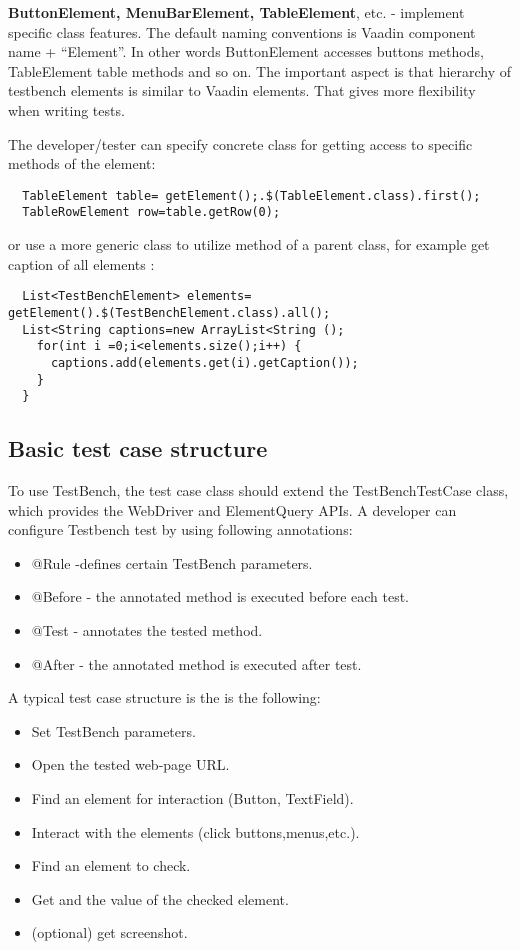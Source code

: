 \textbf{ButtonElement, MenuBarElement, TableElement}, etc. - implement specific
class features. The default naming conventions is Vaadin component name + ``Element''.
In other words ButtonElement accesses buttons methods, TableElement table methods and so on.
The important aspect is that hierarchy of testbench elements is similar to Vaadin elements.
That gives more flexibility when writing tests.

The  developer/tester can specify concrete class for getting access to specific methods of the element:
 
 \lstset{language=Java}
  \begin{lstlisting}
  TableElement table= getElement();.$(TableElement.class).first();
  TableRowElement row=table.getRow(0);
 \end{lstlisting}
 
or use a more generic class to utilize method of a parent class, for example get caption of all elements :

  \lstset{language=Java}
  \begin{lstlisting}
  List<TestBenchElement> elements= getElement().$(TestBenchElement.class).all();
  List<String captions=new ArrayList<String ();
    for(int i =0;i<elements.size();i++) {
      captions.add(elements.get(i).getCaption());
    }
  }
  \end{lstlisting}

\subsection {Basic test case structure}
To use TestBench, the test case class should extend the TestBenchTestCase class,
which provides the WebDriver and ElementQuery APIs. A developer
can configure Testbench test by using following annotations:
\begin{itemize}
  \item @Rule -defines certain TestBench parameters.
  \item @Before - the annotated method is executed before each test.
  \item @Test - annotates the tested method.
  \item @After - the annotated method is executed after test.
\end{itemize}

A typical test case structure is the is the following:
\begin{itemize}
  \item Set TestBench parameters.
  \item Open the tested web-page URL.
  \item Find an element for interaction (Button, TextField).
  \item Interact with the elements (click buttons,menus,etc.).
  \item Find an element to check.
  \item Get and the value of the checked element.
  \item (optional) get screenshot.
\end{itemize}

